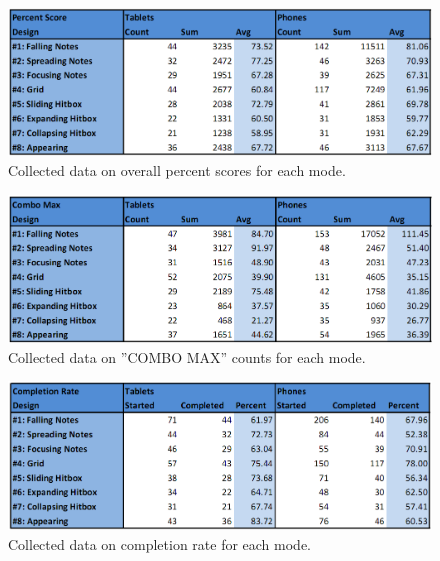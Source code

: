 \documentclass{sig-alternate}
\begin{document}
\begin{figure}[htb!]
	\begin{center}
		\includegraphics[width=1\linewidth]{figure_data_score}
	\end{center}
	\vspace{-12pt}
	\caption{Collected data on overall percent scores for each mode.}
	\label{fig:data_score}
\end{figure}
\begin{figure}[htb!]
	\begin{center}
		\includegraphics[width=1\linewidth]{figure_data_combo}
	\end{center}
	\vspace{-12pt}
	\caption{Collected data on ''COMBO MAX'' counts for each mode.}
	\label{fig:data_combo}
\end{figure}
\begin{figure}[htb!]
	\begin{center}
		\includegraphics[width=1\linewidth]{figure_data_completion}
	\end{center}
	\vspace{-12pt}
	\caption{Collected data on completion rate for each mode.}
	\label{fig:data_completion}
\end{figure}
\end{document}
